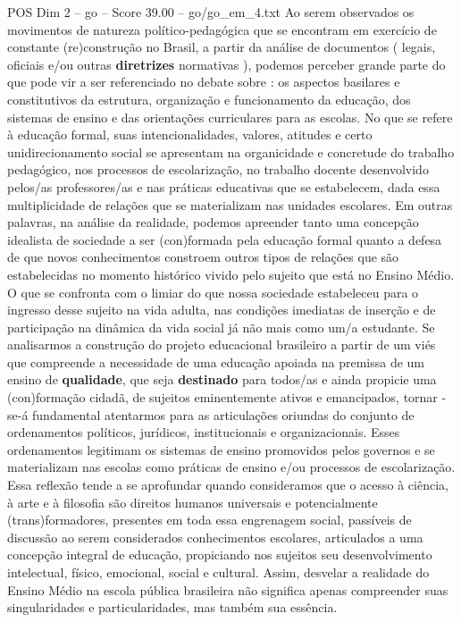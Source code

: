\begin{textsample}{POS Dim 2 – go – Score 39.00 – go/go\_em\_4.txt}
Ao serem observados os movimentos de natureza político-pedagógica que se encontram em exercício de constante (re)construção no Brasil, a partir da análise de documentos ( legais, oficiais e/ou outras \textbf{diretrizes} normativas ), podemos perceber grande parte do que pode vir a ser referenciado no debate sobre : os aspectos basilares e constitutivos da estrutura, organização e funcionamento da educação, dos sistemas de ensino e das orientações curriculares para as escolas.
No que se refere à educação formal, suas intencionalidades, valores, atitudes e certo unidirecionamento social se apresentam na organicidade e concretude do trabalho pedagógico, nos processos de escolarização, no trabalho docente desenvolvido pelos/as professores/as e nas práticas educativas que se estabelecem, dada essa multiplicidade de relações que se materializam nas unidades escolares.
Em outras palavras, na análise da realidade, podemos apreender tanto uma concepção idealista de sociedade a ser (con)formada pela educação formal quanto a defesa de que novos conhecimentos constroem outros tipos de relações que são estabelecidas no momento histórico vivido pelo sujeito que está no Ensino Médio.
O que se confronta com o limiar do que nossa sociedade estabeleceu para o ingresso desse sujeito na vida adulta, nas condições imediatas de inserção e de participação na dinâmica da vida social já não mais como um/a estudante.
Se analisarmos a construção do projeto educacional brasileiro a partir de um viés que compreende a necessidade de uma educação apoiada na premissa de um ensino de \textbf{qualidade}, que seja \textbf{destinado} para todos/as e ainda propicie uma (con)formação cidadã, de sujeitos eminentemente ativos e emancipados, tornar -se-á fundamental atentarmos para as articulações oriundas do conjunto de ordenamentos políticos, jurídicos, institucionais e organizacionais.
Esses ordenamentos legitimam os sistemas de ensino promovidos pelos governos e se materializam nas escolas como práticas de ensino e/ou processos de escolarização.
Essa reflexão tende a se aprofundar quando consideramos que o acesso à ciência, à arte e à filosofia são direitos humanos universais e potencialmente (trans)formadores, presentes em toda essa engrenagem social, passíveis de discussão ao serem considerados conhecimentos escolares, articulados a uma concepção integral de educação, propiciando nos sujeitos seu desenvolvimento intelectual, físico, emocional, social e cultural.
Assim, desvelar a realidade do Ensino Médio na escola pública brasileira não significa apenas compreender suas singularidades e particularidades, mas também sua essência.

\end{textsample}
